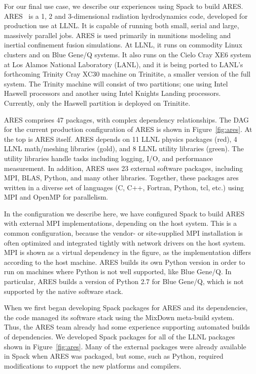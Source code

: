 For our final use case, we describe our experiences using Spack to build ARES.
ARES~\cite{ares1,ares2} is a 1, 2 and 3-dimensional radiation hydrodynamics code,
developed for production use at LLNL.  It is capable of running both small, serial
and large, massively parallel jobs. ARES is used primarily in munitions modeling
and inertial confinement fusion simulations.
%
At LLNL, it runs on commodity Linux clusters and on Blue Gene/Q systems.
It also runs on the Cielo Cray XE6 system at Los Alamos National Laboratory (LANL), and
it is being ported to LANL's forthcoming Trinity Cray XC30 machine on Trinitite,
a smaller version of the full system.  The Trinity machine will consist of two partitions; 
one using Intel Haswell processors and another using Intel Knights Landing processors.
Currently, only the Haswell partition is deployed on Trinitite.

ARES comprises 47 packages, with complex dependency relationships.  The DAG for
the current production configuration of ARES is shown in Figure~\ref{fig:ares}.
At the top is ARES itself.  ARES depends on 11 LLNL physics packages (red), 
4 LLNL math/meshing libraries (gold), and 8 LLNL utility libraries (green).
The utility libraries handle tasks including logging, I/O, and performance
measurement. In addition, ARES uses 23 external software packages, including MPI, BLAS, 
Python, and many other libraries.  Together, these packages ares written in a diverse
set of languages (C, C++, Fortran, Python, tcl, etc.) using MPI and OpenMP for parallelism. 

In the configuration we describe here, we have configured Spack to build ARES with
external MPI implementations, depending on the host system. This is a common
configuration, because the vendor- or site-supplied MPI installation is often
optimized and integrated tightly with network drivers on the host system. MPI is shown
as a virtual dependency in the figure, as the implementation differs according to the
host machine.  ARES builds its own Python version in order to run on machines
where Python is not well supported, like Blue Gene/Q.  In particular, ARES builds 
a version of Python 2.7 for Blue Gene/Q, which is not supported by the native
software stack.

When we first began developing Spack packages for ARES and its dependencies,
the code managed its software stack using the MixDown meta-build system.  
Thus, the ARES team already had some experience supporting automated builds of
dependencies. We developed Spack packages for all of the LLNL packages shown in
Figure~\ref{fig:ares}.
Many of the external packages were already available in Spack when ARES was
packaged, but some, such as Python, required modifications to support the
new platforms and compilers.

